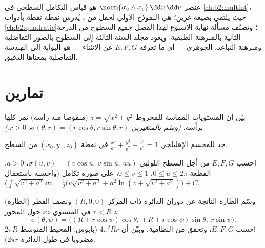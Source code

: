 \begin{remark}
عنصر  $\norm{\sigma_u\wedge\sigma_v}\,\dd u\,\dd v$ هو قياس التكامل السطحي في \cref{ch:b2:multint}، حيث يلتقي
بصيغة غرين؛  هي النموذج الأولي لحقل من ، يُدرس نقطة نقطة بأدوات \cref{ch:b2:quadratic}؛ وتصنّف مسألة نهاية
الأسبوع لهذا الفصل جميع السطوح من الدرجة الثانية بالمبرهنة الطيفية.
ويعود مجلد السنة الثالثة إلى السطوح بالصور التفاضلية ومبرهنة
التباعد،  الجوهري --- أي ما تعرفه $E, F, G$ عن الانثناء ---
هو البوابة إلى الهندسة التفاضلية بمعناها الدقيق.
\end{remark}

\section{تمارين}

\begin{exercise}[$\star$]\label{exo:b2:surfaces:1}
بيّن أن المستويات المماسة للمخروط $z = \sqrt{x^2 + y^2}$ (منقوصا منه رأسه) تمر كلها
برأسه. \emph{(وسّم بالمتغيرين $\sigma(\theta, r) = (r\cos\theta, r\sin\theta, r)$، $r > 0$.)}
\end{exercise}

\begin{exercise}[$\star$]\label{exo:b2:surfaces:2}
جد  للمجسم الإهليلجي $\frac{x^2}{a^2} +
\frac{y^2}{b^2} + \frac{z^2}{c^2} = 1$ في نقطة $(x_0, y_0,
z_0)$ من السطح.
\end{exercise}

\begin{exercise}[$\star$]\label{exo:b2:surfaces:3}
احسب $E, F, G$ من أجل السطح اللولبي $\sigma(u, v) = (v\cos u,\
v\sin u,\ au)$، $a > 0$،  القطعة
$0 \leq u \leq
2\pi$، $0 \leq v \leq 1$، على صورة تكامل (واحسبه باستعمال $\int\sqrt{v^2 + a^2}\,\dd v = \frac12\bigl(v\sqrt{v^2+a^2} +
a^2\ln(v + \sqrt{v^2 + a^2})\bigr) + C$).
\end{exercise}

\begin{exercise}[$\star\star$]\label{exo:b2:surfaces:4}
(الطارة) وسّم الطارة الناتجة عن دوران الدائرة ذات المركز $(R, 0, 0)$
ونصف القطر $r < R$ في المستوي $xz$ حول المحور $z$:
\[
\sigma(\theta, \psi) = \bigl((R + r\cos\psi)\cos\theta,\
(R + r\cos\psi)\sin\theta,\ r\sin\psi\bigr).
\]
احسب $E, F, G$، وتحقق من النظامية، وبيّن أن  $4\pi^2 R r$ (بابوس:
المحيط المتوسط $2\pi R$ مضروبا في طول الدائرة $2\pi r$).
\end{exercise}

